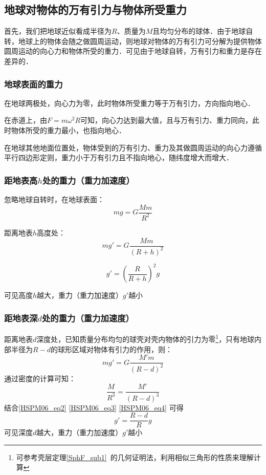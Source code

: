 \subsection{地球对物体的万有引力与物体所受重力}

首先，我们把地球近似看成半径为$R$、质量为$M$且均匀分布的球体．由于地球自转，地球上的物体会随之做圆周运动，则地球对物体的万有引力可分解为提供物体圆周运动的向心力和物体所受的重力．可见由于地球自转，万有引力和重力是存在差异的．

\subsubsection{地球表面的重力}

在地球两极处，向心力为零，此时物体所受重力等于万有引力，方向指向地心．

在赤道上，由$F=m\omega^2R$可知，向心力达到最大值，且与万有引力、重力同向，此时物体所受的重力最小，也指向地心．

在地球其他地面位置处，物体受到的万有引力、重力及其做圆周运动的向心力遵循平行四边形定则，重力小于万有引力且不指向地心，随纬度增大而增大．

\subsubsection{距地表高$h$处的重力（重力加速度）}

忽略地球自转时，在地球表面：
\begin{equation}\label{HSPM06_eq2}
mg=G\frac{Mm}{R^2}
\end{equation}

距离地表$h$高度处：
\begin{equation}
mg'=G\frac{Mm}{(R+h)^2}
\end{equation}

\begin{equation}
g'=(\frac{R}{R+h})^2g
\end{equation}

可见高度$h$越大，重力（重力加速度）$g'$越小

\subsubsection{距地表深$d$处的重力（重力加速度）}

距离地表$d$深度处，已知质量分布均匀的球壳对壳内物体的引力为零\footnote{可参考壳层定理\autoref{SphF_sub1}~的几何证明法，利用相似三角形的性质来理解计算}，只有地球内部半径为$R-d$的球形区域对物体有引力的作用，则：
\begin{equation}\label{HSPM06_eq3}
mg'=G\frac{M'm}{(R-d)^2}
\end{equation}
通过密度的计算可知：
\begin{equation}\label{HSPM06_eq4}
\frac{M}{R^3}=\frac{M'}{(R-d)^3}
\end{equation}
结合\autoref{HSPM06_eq2} \autoref{HSPM06_eq3} \autoref{HSPM06_eq4} 可得
\begin{equation}
g'=\frac{R-d}{R}g
\end{equation}
可见深度$d$越大，重力（重力加速度）$g'$越小

